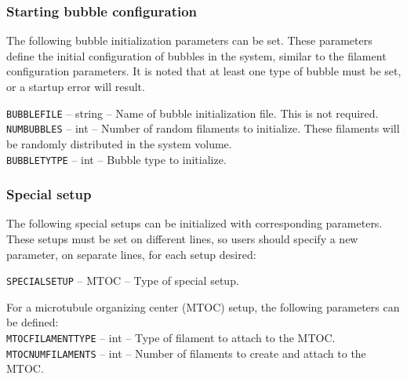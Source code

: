 \documentclass[11pt, oneside]{article}   	%
\begin{document}
\normalsize

\subsubsection{Starting bubble configuration}

The following bubble initialization parameters can be set. These parameters define the initial configuration of bubbles in the system, similar to the filament configuration parameters. It is noted that at least one type of bubble must be set, or a startup error will result.\\

\small

  \noindent\texttt{BUBBLEFILE} -- string -- Name of bubble initialization file. This is not required.\\

  \noindent\texttt{NUMBUBBLES} -- int -- Number of random filaments to initialize. These filaments will be randomly 
  distributed in the system volume.\\

   \noindent\texttt{BUBBLETYTPE} -- int -- Bubble type to initialize.\\
   
\normalsize

\subsubsection{Special setup}

The following special setups can be initialized with corresponding parameters. These setups must be set on different lines, so users should specify a new parameter, on separate lines, for each setup desired:\\

\small 

\noindent\texttt{SPECIALSETUP} -- MTOC -- Type of special setup. \\

\normalsize

\noindent For a microtubule organizing center (MTOC) setup, the following parameters can be defined:\\

\small
  \noindent\texttt{MTOCFILAMENTTYPE} -- int -- Type of filament to attach to the MTOC.\\

  \noindent\texttt{MTOCNUMFILAMENTS} -- int -- Number of filaments to create and attach to the MTOC.\\
  
\end{document}
